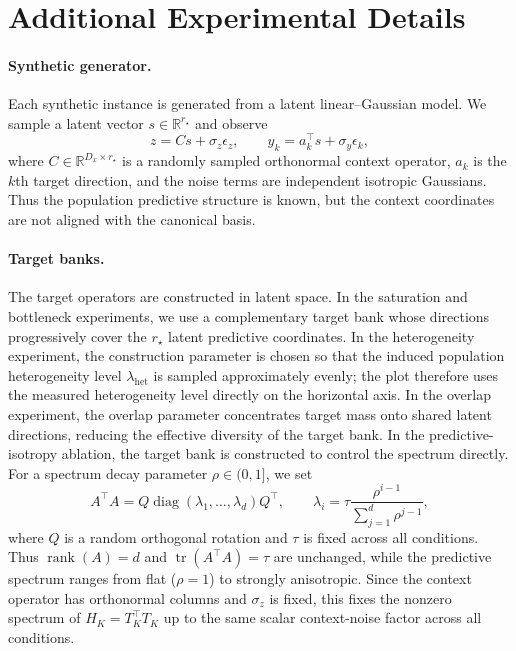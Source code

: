 \section{Additional Experimental Details}
\label{app:experimental-details}


\paragraph{Synthetic generator.}
Each synthetic instance is generated from a latent linear--Gaussian model. We
sample a latent vector $s \in \mathbb{R}^{r_\star}$ and observe
\[
    z = C s + \sigma_z \epsilon_z,
    \qquad
    y_k = a_k^\top s + \sigma_y \epsilon_k,
\]
where $C \in \mathbb{R}^{D_x \times r_\star}$ is a randomly sampled
orthonormal context operator, $a_k$ is the $k$th target direction, and the noise
terms are independent isotropic Gaussians. Thus the population predictive
structure is known, but the context coordinates are not aligned with the
canonical basis.


\paragraph{Target banks.}
The target operators are constructed in latent space. In the saturation and
bottleneck experiments, we use a complementary target bank whose directions
progressively cover the $r_\star$ latent predictive coordinates. In the
heterogeneity experiment, the construction parameter is chosen so that the
induced population heterogeneity level $\lambda_{\mathrm{het}}$ is sampled
approximately evenly; the plot therefore uses the measured heterogeneity level
directly on the horizontal axis. In the overlap experiment, the overlap
parameter concentrates target mass onto shared latent directions, reducing the
effective diversity of the target bank.
In the predictive-isotropy ablation, the target bank is constructed to control
the spectrum directly. For a spectrum decay parameter $\rho\in(0,1]$, we set
\[
    A^\top A
    =
    Q\operatorname{diag}(\lambda_1,\ldots,\lambda_d)Q^\top,
    \qquad
    \lambda_i
    =
    \tau\frac{\rho^{i-1}}{\sum_{j=1}^d\rho^{j-1}},
\]
where $Q$ is a random orthogonal rotation and $\tau$ is fixed across all
conditions. Thus $\operatorname{rank}(A)=d$ and
$\operatorname{tr}(A^\top A)=\tau$ are unchanged, while the predictive spectrum
ranges from flat ($\rho=1$) to strongly anisotropic. Since the context operator
has orthonormal columns and $\sigma_z$ is fixed, this fixes the nonzero spectrum
of $H_K=T_K^\top T_K$ up to the same scalar context-noise factor across all
conditions.

